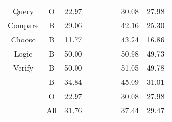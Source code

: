 \begin{tabular}{cccllllcc}
Query                                             & O                    &      22.97                                             &                       &                        &                       &                        & 30.08       & 27.98      \\
\rowcolor[HTML]{F3F3F3} 
Compare                                           & B                    & 29.06                                             &                       &                        &                       &                        & 42.16       & 25.30      \\
Choose                                            & B                    & 11.77                                             &                       &                        &                       &                        & 43.24       & 16.86      \\
\rowcolor[HTML]{F3F3F3} 
Logic                                             & B                    & 50.00                                             &                       &                        &                       &                        & 50.98       & 49.73      \\
Verify                                            & B                    & 50.00                                             &                       &                        &                       &                        & 51.05       & 49.78      \\
\rowcolor[HTML]{F3F3F3} 
\cellcolor[HTML]{F3F3F3}                          & B                    & 34.84                                             &                       &                        &                       &                        & 45.09       & 31.01      \\
\rowcolor[HTML]{F3F3F3} 
\cellcolor[HTML]{F3F3F3}                          & O                    & \multicolumn{1}{l}{\cellcolor[HTML]{F3F3F3} 22.97} &                       &                        &                       &                        & 30.08       & 27.98      \\
\rowcolor[HTML]{F3F3F3} 
\multirow{-3}{*}{\cellcolor[HTML]{F3F3F3}Overall} & All                  & 31.76                                             &                       &                        &                       &                        & 37.44       & 29.47     
\end{tabular}